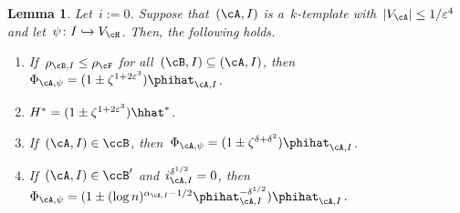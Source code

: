 \documentclass[11pt]{amsart}
\newcommand{\eps}{\varepsilon}
\DeclarePairedDelimiter{\abs}{\lvert}{\rvert}
\newcommand{\injection}{\hookrightarrow}
\newtheorem{lemma}[algocf]{Lemma}
\theoremstyle{definition}
\numberwithin{equation}{section}
\begin{document}
	
	\begin{lemma}\label{lemma: initially good}
		Let~$i:=0$.
		Suppose that~$(\cA,I)$ is a~$k$-template with~$\abs{V_\cA}\leq 1/\eps^4$ and let~$\psi\colon I\injection V_\cH$.
		Then, the following holds.
		\begin{enumerate}[label=\textup{(\roman*)}]
			\item If~$\rho_{\cB,I}\leq \rho_\cF$ for all~$(\cB,I)\subseteq(\cA,I)$, then~$\Phi_{\cA,\psi}=(1\pm \zeta^{1+2\eps^3})\phihat_{\cA,I}$.
			\item $H^*=(1\pm \zeta^{1+2\eps^3})\hhat^*$.
			\item If~$(\cA,I)\in\ccB$, then~$\Phi_{\cA,\psi}=(1\pm \zeta^{\delta+\delta^2})\phihat_{\cA,I}$.
			\item If~$(\cA,I)\in\ccB'$ and~$i_{\cA,I}^{\delta^{1/2}}=0$, then~$\Phi_{\cA,\psi}=(1\pm (\log n)^{\alpha_{\cA,I}-1/2}\phihat_{\cA,I}^{-\delta^{1/2}})\phihat_{\cA,I}$.
		\end{enumerate}
	\end{lemma}
\end{document}
